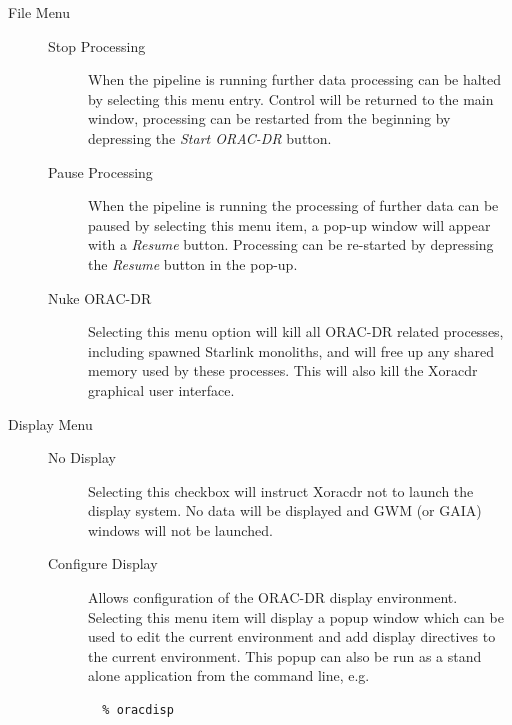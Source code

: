 \documentclass[twoside,11pt]{article}
\renewcommand{\_}{\texttt{\symbol{95}}}
\begin{document}
\begin{description}

\item[File Menu] \mbox{}\begin{description}

\item[Stop Processing] \mbox{}

When the pipeline is running further data processing can be halted by
selecting this menu entry. Control will be returned to the main
window, processing can be restarted from the beginning by depressing
the \textit{Start ORAC-DR} button.


\item[Pause Processing] \mbox{}

When the pipeline is running the processing of further data can be
paused by selecting this menu item, a pop-up window will appear with a
\textit{Resume} button. Processing can be re-started by depressing the
\textit{Resume} button in the pop-up.


\item[Nuke ORAC-DR] \mbox{}

Selecting this menu option will kill all ORAC-DR related processes,
including spawned Starlink monoliths, and will free up any shared
memory used by these processes. This will also kill the Xoracdr
graphical user interface.

\end{description}

\item[Display Menu] \mbox{}\begin{description}

\item[No Display] \mbox{}

Selecting this checkbox will instruct Xoracdr not to launch the
display system. No data will be displayed and GWM (or GAIA) windows
will not be launched.


\item[Configure Display] \mbox{}

Allows configuration of the ORAC-DR display environment. Selecting
this menu item will display a popup window which can be used to edit
the current environment and add display directives to the current
environment. This popup can also be run as a stand alone application
from the command line, e.g.

\begin{verbatim}
  % oracdisp
\end{verbatim}



\end{description}
\end{description}
\end{document}
